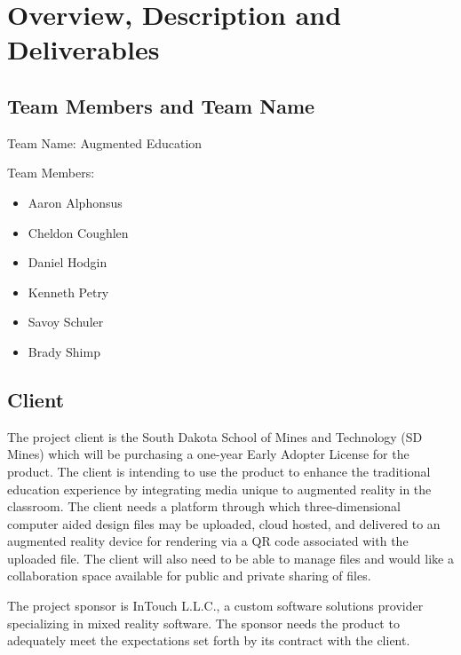 

\chapter{Overview, Description and Deliverables}


\section{Team Members and Team Name}

Team Name: Augmented Education

\noindent Team Members:
\begin{itemize}
	\item Aaron Alphonsus
	\item Cheldon Coughlen
	\item Daniel Hodgin
	\item Kenneth Petry
	\item Savoy Schuler
	\item Brady Shimp
\end{itemize}

\section{Client}

The project client is the South Dakota School of Mines and Technology (SD Mines) which will be purchasing a one-year Early Adopter License for the product. The client is intending to use the product to enhance the traditional education experience by integrating media unique to augmented reality in the classroom. The client needs a platform through which three-dimensional computer aided design files may be uploaded, cloud hosted, and delivered to an augmented reality device for rendering via a QR code associated with the uploaded file. The client will also need to be able to manage files and would like a collaboration space available for public and private sharing of files. 

The project sponsor is InTouch L.L.C., a custom software solutions provider specializing in mixed reality software. The sponsor needs the product to adequately meet the expectations set forth by its contract with the client. 

